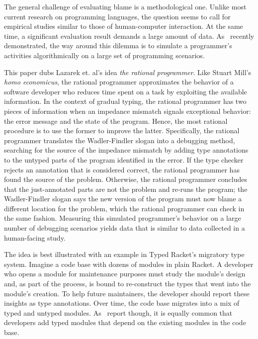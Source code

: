 
The general challenge of evaluating blame is a methodological one. Unlike most
current research on programming languages, the question seems to call for
empirical studies similar to those of human-computer interaction. At the same
time, a significant evaluation result demands a large amount of
data. As~\citet{lksfd-popl-2020} recently demonstrated, the way around this
dilemma is to simulate a programmer's activities algorithmically on a large set
of programming scenarios.



This paper dubs Lazarek et. al's idea {\em the rational programmer\/}. Like Stuart
Mill's {\it homo economicus\/}, the rational programmer approximates the
behavior of a software developer who reduces time spent on a task by exploiting the
available information. In the context of gradual typing, the rational programmer
has two pieces of information when an impedance mismatch signals exceptional
behavior: the error message and the state of the program. Hence, the most
rational procedure is to use the former to improve the latter. Specifically,
the rational programmer translates the Wadler-Findler slogan into a debugging
method, searching for the source of the impedance mismatch by adding type
annotations to the untyped parts of the program identified in the error.
If the type checker rejects an annotation that is considered correct, the
rational programmer has found the source of the problem.
Otherwise, the rational programmer concludes that the just-annotated parts are not the problem
and re-runs the program;
the Wadler-Findler slogan says the new version of the program must now blame a different location for the problem, which the rational programmer can check in the same fashion.
Measuring this simulated
programmer's behavior on a large number of debugging scenarios yields data that
is similar to data collected in a human-facing study.

The idea is best illustrated with an example in Typed Racket's migratory type
system. Imagine a code base with dozens of modules in plain Racket. A developer
who opens a module for maintenance purposes must study the module's design and,
as part of the process, is bound to re-construct the types that went into the
module's creation.  To help future maintainers, the developer should report
these insights as type annotations. Over time, the code base migrates into a mix
of typed and untyped modules. As~\citet{tfffgksst-snapl-2017} report though,
it is equally common that developers add typed modules that depend on
the existing modules in the code base.

